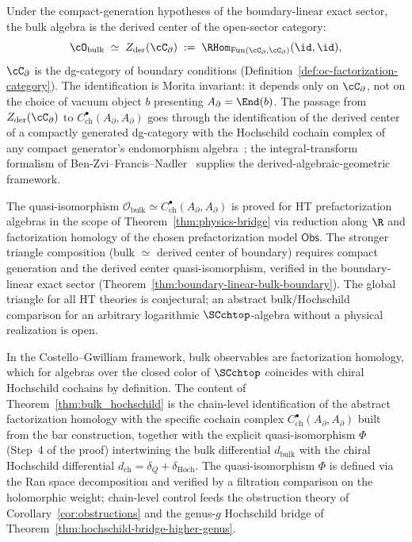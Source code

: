 \begin{remark}
\label{rem:bulk-categorical}
Under the compact-generation hypotheses of the
boundary-linear exact sector, the bulk algebra is the
derived center of the open-sector category:
\[
\cO_{\mathrm{bulk}} \;\simeq\; Z_{\mathrm{der}}(\cC_\partial) \;:=\; \RHom_{\mathrm{Fun}(\cC_\partial, \cC_\partial)}(\id, \id),
\]
$\cC_\partial$ is the dg-category of boundary conditions (Definition~\ref{def:oc-factorization-category}). The identification is Morita invariant: it depends only on $\cC_\partial$, not on the choice of vacuum object $b$ presenting $A_\partial = \End(b)$. The passage from $Z_{\mathrm{der}}(\cC_\partial)$ to $C^\bullet_{\mathrm{ch}}(A_\partial, A_\partial)$ goes through the identification of the derived center of a compactly generated dg-category with the Hochschild cochain complex of any compact generator's endomorphism algebra~\cite{Kel06}; the integral-transform formalism of Ben-Zvi--Francis--Nadler~\cite{BZFN10} supplies the derived-algebraic-geometric framework.
\end{remark}

\begin{remark}
\label{rem:bulk-hochschild-scope}
The quasi-isomorphism $\mathcal{O}_{\mathrm{bulk}} \simeq C^\bullet_{\mathrm{ch}}(A_{\partial}, A_{\partial})$ is proved for HT prefactorization algebras in the scope of Theorem~\ref{thm:physics-bridge} via reduction along $\R$ and factorization homology of the chosen prefactorization model $\mathsf{Obs}$. The stronger triangle composition (bulk $\simeq$ derived center of boundary) requires compact generation and the derived center quasi-isomorphism, verified in the boundary-linear exact sector (Theorem~\ref{thm:boundary-linear-bulk-boundary}). The global triangle for all HT theories is conjectural; an abstract bulk/Hochschild comparison for an arbitrary logarithmic $\SCchtop$-algebra without a physical realization is open.
\end{remark}

\begin{remark}
\label{rem:bulk-hochschild-content}
In the Costello--Gwilliam framework, bulk observables are
factorization homology, which for algebras over the closed color
of $\SCchtop$ coincides with chiral Hochschild cochains by definition.
The content of Theorem~\ref{thm:bulk_hochschild} is the chain-level identification of the abstract
factorization homology with the specific cochain complex
$C^\bullet_{\mathrm{ch}}(A_\partial, A_\partial)$ built from the bar
construction, together with the explicit quasi-isomorphism $\Phi$
(Step~4 of the proof) intertwining the bulk
differential $d_{\mathrm{bulk}}$ with the chiral Hochschild
differential $d_{\mathrm{ch}} = \delta_Q + \delta_{\mathrm{Hoch}}$.
The quasi-isomorphism $\Phi$ is defined via the Ran space decomposition
and verified by a filtration comparison on the holomorphic weight;
chain-level control feeds the obstruction theory of
Corollary~\ref{cor:obstructions} and the
genus-$g$ Hochschild bridge of
Theorem~\ref{thm:hochschild-bridge-higher-genus}.
\end{remark}

